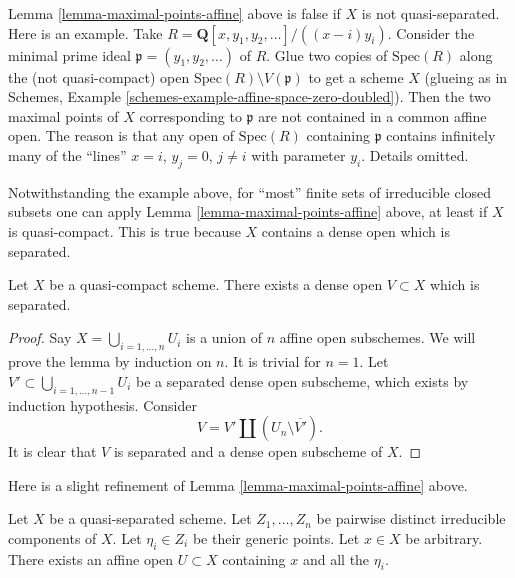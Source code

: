 \begin{remark}
\label{remark-maximal-points-affine}
Lemma \ref{lemma-maximal-points-affine} above is false if $X$
is not quasi-separated. Here is an example. Take
$R = \mathbf{Q}[x, y_1, y_2, \ldots]/((x-i)y_i)$.
Consider the minimal prime ideal $\mathfrak p = (y_1, y_2, \ldots)$
of $R$. Glue two copies of $\text{Spec}(R)$ along the
(not quasi-compact) open $\text{Spec}(R) \setminus V(\mathfrak p)$
to get a scheme $X$ (glueing as in
Schemes, Example \ref{schemes-example-affine-space-zero-doubled}).
Then the two maximal points of $X$ corresponding to $\mathfrak p$
are not contained in a common affine open. The reason is
that any open of $\text{Spec}(R)$ containing $\mathfrak p$
contains infinitely many of the ``lines'' $x = i$, $y_j = 0$,
$j \not = i$ with parameter $y_i$. Details omitted.
\end{remark}

\noindent
Notwithstanding the example above, for ``most'' finite sets of irreducible
closed subsets one can apply Lemma \ref{lemma-maximal-points-affine} above,
at least if $X$ is quasi-compact. This is true because $X$ contains a dense
open which is separated.

\begin{lemma}
\label{lemma-quasi-compact-dense-open-separated}
Let $X$ be a quasi-compact scheme.
There exists a dense open $V \subset X$ which is separated.
\end{lemma}

\begin{proof}
Say $X = \bigcup_{i = 1, \ldots, n} U_i$ is a union of $n$ affine open
subschemes. We will prove the lemma by induction on $n$. It is trivial for
$n = 1$. Let $V' \subset \bigcup_{i = 1, \ldots, n - 1} U_i$ be a separated
dense open subscheme, which exists by induction hypothesis. Consider
$$
V = V' \coprod (U_n \setminus \overline{V'}).
$$
It is clear that $V$ is separated and a dense open subscheme of $X$.
\end{proof}

\noindent
Here is a slight refinement of Lemma \ref{lemma-maximal-points-affine} above.

\begin{lemma}
\label{lemma-point-and-maximal-points-affine}
Let $X$ be a quasi-separated scheme. Let $Z_1, \ldots, Z_n$ be pairwise
distinct irreducible components of $X$. Let $\eta_i \in Z_i$ be their
generic points. Let $x \in X$ be arbitrary.
There exists an affine open $U \subset X$ containing
$x$ and all the $\eta_i$.
\end{lemma}


